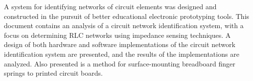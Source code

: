 % 
% 
%


A system for identifying networks of circuit elements was designed and constructed in the pursuit of better educational electronic prototyping tools.
This document contains an analysis of a circuit network identification system, with a focus on determining RLC networks using impedance sensing techniques.  
A design of both hardware and software implementations of the circuit network identification system are presented, and the results of the implementations are analyzed.
Also presented is a method for surface-mounting breadboard finger springs to printed circuit boards.

